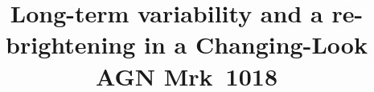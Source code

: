 \documentclass[twocolumn]{aastex63}
\begin{document}
\def\sectionautorefname{Section}
\def\subsectionautorefname{Section}

\title{Long-term variability and a re-brightening in a Changing-Look AGN Mrk~1018}


\end{document}
